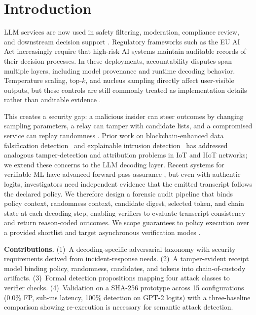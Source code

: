 \documentclass[conference]{IEEEtran}
\begin{document}
\section{Introduction}
LLM services are now used in safety filtering, moderation, compliance review, and downstream decision support \cite{Inan2023LlamaGuard,Cho2024Moderators,Gu2024CoPilotedAuditing}. Regulatory frameworks such as the EU AI Act \cite{EUAIACT2024} increasingly require that high-risk AI systems maintain auditable records of their decision processes. In these deployments, accountability disputes span multiple layers, including model provenance and runtime decoding behavior. Temperature scaling, top-$k$, and nucleus sampling directly affect user-visible outputs, but these controls are still commonly treated as implementation details rather than auditable evidence \cite{holtzman2020curiouscaseneuraltext,ZKML2024}.

This creates a security gap: a malicious insider can steer outcomes by changing sampling parameters, a relay can tamper with candidate lists, and a compromised service can replay randomness \cite{Wei2024SpecSideChannel}. Prior work on blockchain-enhanced data falsification detection~\cite{Ahakonye2025DataFalsification} and explainable intrusion detection~\cite{Ahakonye2024MLExplainIDS} has addressed analogous tamper-detection and attribution problems in IoT and IIoT networks; we extend these concerns to the LLM decoding layer. Recent systems for verifiable ML have advanced forward-pass assurance \cite{Delphi2020,zkLLM2024,ZKTorch2025}, but even with authentic logits, investigators need independent evidence that the emitted transcript follows the declared policy. We therefore design a forensic audit pipeline that binds policy context, randomness context, candidate digest, selected token, and chain state at each decoding step, enabling verifiers to evaluate transcript consistency and return reason-coded outcomes. We scope guarantees to policy execution over a provided shortlist and target asynchronous verification modes \cite{Gu2024CoPilotedAuditing,Akor2025ProvAuditChain}.

\textbf{Contributions.}
(1)~A decoding-specific adversarial taxonomy with security requirements derived from incident-response needs.
(2)~A tamper-evident receipt model binding policy, randomness, candidates, and tokens into chain-of-custody artifacts.
(3)~Formal detection propositions mapping four attack classes to verifier checks.
(4)~Validation on a SHA-256 prototype across 15 configurations (0.0\% FP, sub-ms latency, 100\% detection on GPT-2 logits) with a three-baseline comparison showing re-execution is necessary for semantic attack detection.
\end{document}
